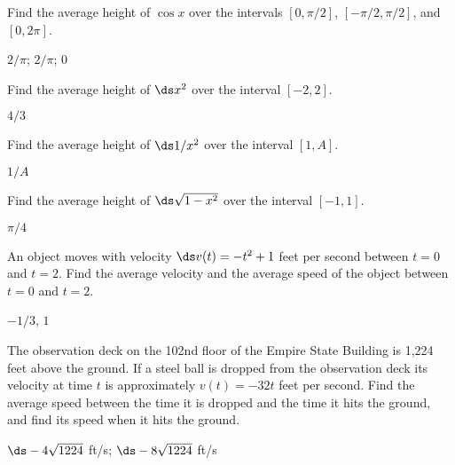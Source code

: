 \begin{enumialphparenastyle}

\begin{ex}
 Find the average height of $\cos x$ over the intervals
$[0,\pi/2]$, $[-\pi/2,\pi/2]$, and $[0,2\pi]$.
\begin{sol}
 $2/\pi$; $2/\pi$; $0$
\end{sol}
\end{ex}

\begin{ex}
 Find the average height of $\ds x^2$ over the interval
$[-2,2]$.
\begin{sol}
 $4/3$
\end{sol}
\end{ex}

\begin{ex}
 Find the average height of $\ds 1/x^2$ over the interval
$[1,A]$.
\begin{sol}
 $1/A$
\end{sol}
\end{ex}

\begin{ex}
 Find the average height of $\ds \sqrt{1-x^2}$ over the interval
$[-1,1]$.
\begin{sol}
 $\pi/4$
\end{sol}
\end{ex}

\begin{ex}
 An object moves with velocity $\ds v(t)=-t^2+1$ feet per second
between $t=0$ and $t=2$. Find the average velocity and the average
speed of the object between $t=0$ and $t=2$.
\begin{sol}
 $-1/3$, $1$
\end{sol}
\end{ex}

\begin{ex}
 The observation deck on the 102nd floor of the Empire State Building
is 1,224 feet above the ground. If a steel ball is dropped from the
observation deck its velocity at time $t$ is approximately $v(t)=-32t$
feet per second. Find the average speed between the time it is dropped
and the time it hits the ground, and find its speed when it hits the
ground.
\begin{sol}
 $\ds -4\sqrt{1224}$ ft/s; $\ds -8\sqrt{1224}$ ft/s
\end{sol}
\end{ex}

\end{enumialphparenastyle}